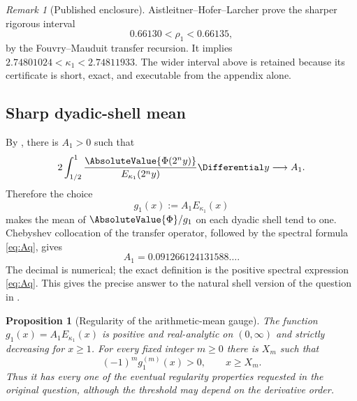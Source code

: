 \documentclass[11pt,oneside]{article}
\newtheorem{proposition}[proposition]{Proposition}
\theoremstyle{definition}
\theoremstyle{remark}
\newtheorem{remark}[remark]{Remark}
\newcommand{\Phiup}{\Phi}
\begin{document}
\begin{remark}[Published enclosure]
Aistleitner--Hofer--Larcher prove the sharper rigorous interval
\begin{equation}
 0.66130<\rho_1<0.66135,
 \label{eq:rho1-AHL}
\end{equation}
by the Fouvry--Mauduit transfer recursion.  It implies
$2.74801024<\kappa_1<2.74811933$.  The wider interval above is retained because its
certificate is short, exact, and executable from the appendix alone.
\end{remark}

\subsection{Sharp dyadic-shell mean}

By , there is $A_1>0$ such that
\begin{equation}
 2\int_{1/2}^{1}
 \frac{\AbsoluteValue{\Phiup(2^ny)}}{E_{\kappa_1}(2^ny)}\Differential y
 \longrightarrow A_1.
 \label{eq:L1-shell-mean}
\end{equation}
Therefore the choice
\begin{equation}
 g_1(x):=A_1E_{\kappa_1}(x)
 \label{eq:g1}
\end{equation}
makes the mean of $\AbsoluteValue{\Phiup}/g_1$ on each dyadic shell tend to one.  Chebyshev
collocation of the transfer operator, followed by the spectral formula
\eqref{eq:Aq}, gives
\begin{equation}
 A_1=0.091266124131588\ldots .
 \label{eq:A1-numeric}
\end{equation}
The decimal is numerical; the exact definition is the positive spectral expression
\eqref{eq:Aq}.  This gives the precise answer to the natural shell version of the question
in \cite{mse-decay}.

\begin{proposition}[Regularity of the arithmetic-mean gauge]
\label{prop:gauge-regularity}
The function $g_1(x)=A_1E_{\kappa_1}(x)$ is positive and real-analytic on $(0,\infty)$ and
strictly decreasing for $x\ge1$.  For every fixed integer $m\ge0$ there is $X_m$ such that
\begin{equation}
 (-1)^m g_1^{(m)}(x)>0,\qquad x\ge X_m.
 \label{eq:eventual-alternating-derivatives}
\end{equation}
Thus it has every one of the eventual regularity properties requested in the original
question, although the threshold may depend on the derivative order.
\end{proposition}
\end{document}
